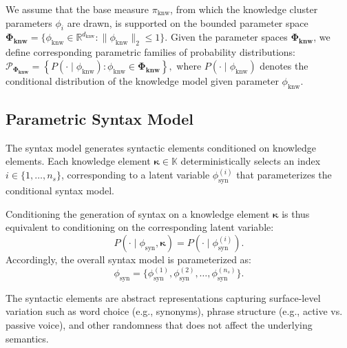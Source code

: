 \documentclass[11pt]{article}
\theoremstyle{plain}
\theoremstyle{definition}
\newcommand{\numsyntax}{n_s}
\newcommand{\knwModel}{\phi_{\text{knw}}}
\newcommand{\synModel}{\phi_{\text{syn}}}
\newcommand{\knwfamily}{\mathbf{\Phi_{\text{knw}}}}
\newcommand{\knwprobability}{\mathcal{P}_{\boldsymbol{\Phi_{\text{knw}}}}}
\newcommand{\knwdimension}{d_{\text{knw}}}
\newcommand{\knwset}{\mathbb{K}}
\newcommand{\basemeasure}{\pi_{\text{knw}}}
\newcommand{\Knwelem}{\boldsymbol{\kappa}}
\newcommand{\jian}[1]{{\it \color{red}{Jian: #1}}}
\begin{document}

We assume that the base measure \( \basemeasure \), from which the knowledge cluster parameters \( \phi_i \) are drawn, is supported on the bounded parameter space 
\( \knwfamily = \{ \knwModel \in \mathbb{R}^{\knwdimension} : \|\knwModel\|_{2} \le 1 \} \).
 Given the parameter spaces \( \knwfamily \), we define corresponding parametric families of probability distributions:
$
\knwprobability = \left\{ P(\cdot\mid \knwModel) : \knwModel \in \knwfamily \right\},
$
where \( P(\cdot\mid\knwModel) \) denotes the conditional distribution of the knowledge model given parameter \( \knwModel \).



\subsection{Parametric Syntax Model}
The syntax model generates syntactic elements conditioned on knowledge elements. 
Each knowledge element \( \Knwelem \in \knwset \) deterministically selects an index \( i \in \{1, \dots, \numsyntax\} \), corresponding to a latent variable \( \synModel^{(i)} \) that parameterizes the conditional syntax model. 

Conditioning the generation of syntax on a knowledge element \( \Knwelem \) is thus equivalent to conditioning on the corresponding latent variable:
\[
P(\cdot \mid \synModel, \Knwelem) = P(\cdot \mid \synModel^{(i)}).
\]
Accordingly, the overall syntax model is parameterized as:
\[
\synModel = \{ \synModel^{(1)}, \synModel^{(2)}, \dots, \synModel^{(\numsyntax)} \}.
\]


The syntactic elements are abstract representations capturing surface-level variation such as word choice (e.g., synonyms), phrase structure (e.g., active vs. passive voice), and other randomness that does not affect the underlying semantics.
\end{document}
